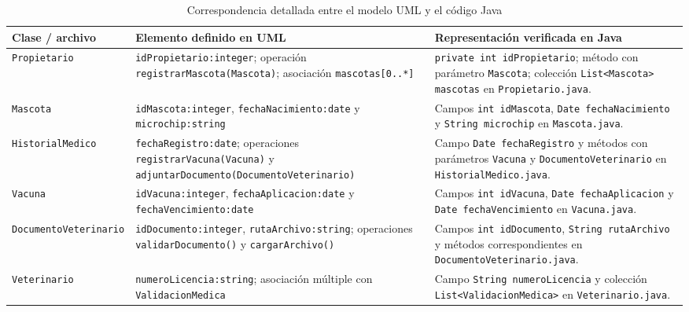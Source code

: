 \documentclass[10pt,a4paper,openany]{report}
\renewcommand{\arraystretch}{1.15}
\begin{document}
	\begin{table}[H]
		\centering
		\caption{Correspondencia detallada entre el modelo UML y el código Java}
		\label{tab:correspondencia-detallada}
		\scriptsize
		\renewcommand{\arraystretch}{1.05}
		
		\begin{tabularx}{\textwidth}
			{|p{2.6cm}|p{5.1cm}|Y|}
			\hline
			
			\textbf{Clase / archivo} &
			\textbf{Elemento definido en UML} &
			\textbf{Representación verificada en Java} \\
			\hline
			
			\texttt{Propietario} &
			\texttt{idPropietario:integer};
			operación \texttt{registrarMascota(Mascota)};
			asociación \texttt{mascotas[0..*]} &
			\texttt{private int idPropietario};
			método con parámetro \texttt{Mascota};
			colección \texttt{List<Mascota> mascotas}
			en \texttt{Propietario.java}. \\
			\hline
			
			\texttt{Mascota} &
			\texttt{idMascota:integer},
			\texttt{fechaNacimiento:date} y
			\texttt{microchip:string} &
			Campos \texttt{int idMascota},
			\texttt{Date fechaNacimiento} y
			\texttt{String microchip}
			en \texttt{Mascota.java}. \\
			\hline
			
			\texttt{HistorialMedico} &
			\texttt{fechaRegistro:date};
			operaciones
			\texttt{registrarVacuna(Vacuna)} y
			\texttt{adjuntarDocumento(DocumentoVeterinario)} &
			Campo \texttt{Date fechaRegistro} y métodos con parámetros
			\texttt{Vacuna} y \texttt{DocumentoVeterinario}
			en \texttt{HistorialMedico.java}. \\
			\hline
			
			\texttt{Vacuna} &
			\texttt{idVacuna:integer},
			\texttt{fechaAplicacion:date} y
			\texttt{fechaVencimiento:date} &
			Campos \texttt{int idVacuna},
			\texttt{Date fechaAplicacion} y
			\texttt{Date fechaVencimiento}
			en \texttt{Vacuna.java}. \\
			\hline
			
			\texttt{DocumentoVeterinario} &
			\texttt{idDocumento:integer},
			\texttt{rutaArchivo:string};
			operaciones \texttt{validarDocumento()} y
			\texttt{cargarArchivo()} &
			Campos \texttt{int idDocumento},
			\texttt{String rutaArchivo} y métodos correspondientes
			en \texttt{DocumentoVeterinario.java}. \\
			\hline
			
			\texttt{Veterinario} &
			\texttt{numeroLicencia:string};
			asociación múltiple con
			\texttt{ValidacionMedica} &
			Campo \texttt{String numeroLicencia} y colección
			\texttt{List<ValidacionMedica>}
			en \texttt{Veterinario.java}. \\
			\hline
			

\end{tabularx}
\end{table}
\end{document}
